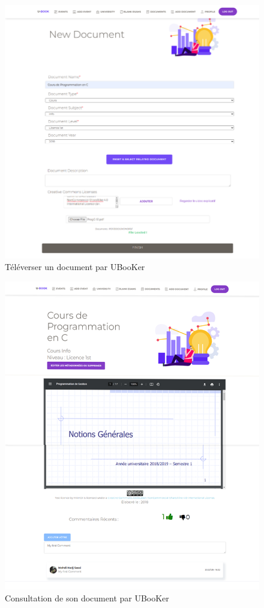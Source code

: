 \documentclass[12pt]{report}
\begin{document}
\begin{figure}[hbtp]
    \centering
    \includegraphics[width=1\textwidth]{101}
    \caption{Téléverser un document par UBooKer}
    \label{fig : televerser doc}
\end{figure}
\begin{figure}[hbtp]
    \centering
    \includegraphics[width=1\textwidth]{16}
    \caption{Consultation de son document par UBooKer}
    \label{fig : consultatoin doc}
\end{figure}
\end{document}
